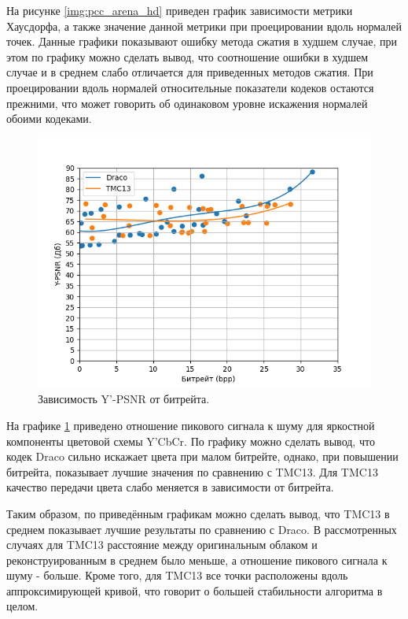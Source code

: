 На рисунке \ref{img:pcc_arena_hd} приведен график зависимости метрики Хаусдорфа,
а также значение данной метрики при проецировании вдоль нормалей точек. Данные
графики показывают ошибку метода сжатия в худшем случае, при этом по графику
можно сделать вывод, что соотношение ошибки в худшем случае и в среднем слабо
отличается для приведенных методов сжатия. При проецировании вдоль нормалей
относительные показатели кодеков остаются прежними, что может говорить об
одинаковом уровне искажения нормалей обоими кодеками.

\begin{figure}[H]
    \centering
    \includegraphics[width=\linewidth]{assets/pcc_arena/approx_y_psnr.png}
    \caption{ Зависимость Y'-PSNR от битрейта. }
    \label{img:pcc_arena_y_psnr}
\end{figure}

На графике \ref{img:pcc_arena_y_psnr} приведено отношение пикового сигнала к
шуму для яркостной компоненты цветовой схемы Y'CbCr. По графику можно сделать
вывод, что кодек Draco сильно искажает цвета при малом битрейте, однако, при
повышении битрейта, показывает лучшие значения по сравнению с TMC13. Для TMC13
качество передачи цвета слабо меняется в зависимости от битрейта.

Таким образом, по приведённым графикам можно сделать вывод, что TMC13 в среднем
показывает лучшие результаты по сравнению с Draco. В рассмотренных случаях для
TMC13 расстояние между оригинальным облаком и реконструированным в среднем было
меньше, а отношение пикового сигнала к шуму - больше. Кроме того, для TMC13 все
точки расположены вдоль аппроксимирующей кривой, что говорит о большей
стабильности алгоритма в целом.

